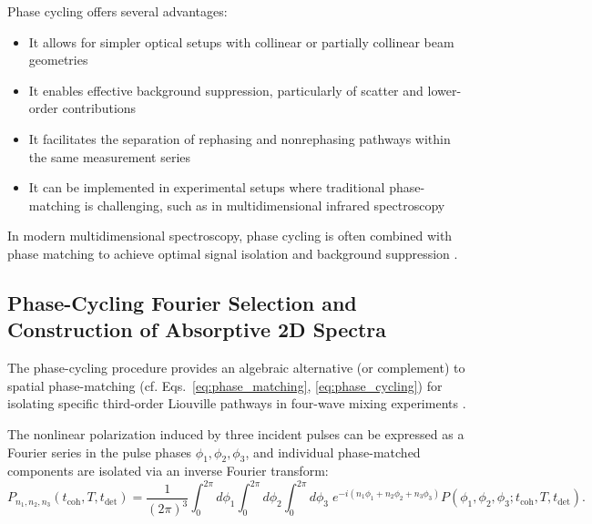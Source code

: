 \noindent Phase cycling offers several advantages:

\begin{itemize}
	\item It allows for simpler optical setups with collinear or partially collinear beam geometries
	\item It enables effective background suppression, particularly of scatter and lower-order contributions
	\item It facilitates the separation of rephasing and nonrephasing pathways within the same measurement series
	\item It can be implemented in experimental setups where traditional phase-matching is challenging, such as in multidimensional infrared spectroscopy
\end{itemize}

\noindent In modern multidimensional spectroscopy, phase cycling is often combined with phase matching to achieve optimal signal isolation and background suppression \cite{huang-fuetal2024developmentphasecyclinginterfacespecific, tianetal2003femtosecondphasecoherenttwodimensional}.

\subsection{Phase-Cycling Fourier Selection and Construction of Absorptive 2D Spectra}
\label{subsec:phase_cycling_fourier_selection}

\noindent The phase-cycling procedure provides an algebraic alternative (or complement) to spatial phase-matching (cf. Eqs.~\eqref{eq:phase_matching}, \eqref{eq:phase_cycling}) for isolating specific third-order Liouville pathways in four-wave mixing experiments \cite{mukamel1995principlesnonlinearoptical, cho2009twodimensionalopticalspectroscopy, jonas2003twodimensionalfemtosecondspectroscopy, brixneretal2004phasestabilizedtwodimensionalelectronic, greenetal2024vibrationalcoherenceshalfbroadband}.

\noindent The nonlinear polarization induced by three incident pulses can be expressed as a Fourier series in the pulse phases $\phi_1, \phi_2, \phi_3$, and individual phase-matched components are isolated via an inverse Fourier transform:
\begin{equation}
	P_{n_1,n_2,n_3}(t_{\text{coh}},T,t_{\text{det}}) =
	\frac{1}{(2\pi)^3} \int_{0}^{2\pi} \!\! d\phi_1
	\int_{0}^{2\pi} \!\! d\phi_2
	\int_{0}^{2\pi} \!\! d\phi_3 \;
	e^{-i(n_1\phi_1+n_2\phi_2+n_3\phi_3)}
	P(\phi_1,\phi_2,\phi_3;t_{\text{coh}},T,t_{\text{det}}).
	\label{eq:continuous_phase_cycling}
\end{equation}

